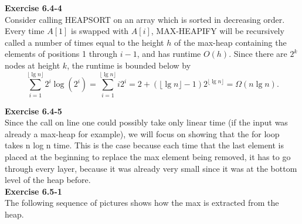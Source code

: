 \documentclass{article}
\begin{document}
\noindent\textbf{Exercise 6.4-4}\\

Consider calling HEAPSORT on an array which is sorted in decreasing order.  Every time $A[1]$ is swapped with $A[i]$, MAX-HEAPIFY will be recursively called a number of times equal to the height $h$ of the max-heap containing the elements of positions 1 through $i-1$, and has runtime $O(h)$.  Since there are $2^k$ nodes at height $k$, the runtime is bounded below by
\[ \sum_{i=1}^{\lfloor\lg n\rfloor} 2^i \log(2^i) =  \sum_{i=1}^{\lfloor\lg n\rfloor} i2^i = 2 + (\lfloor\lg n\rfloor - 1)2^{\lfloor\lg n\rfloor} = \Omega(n\lg n).\]



\noindent\textbf{Exercise 6.4-5}\\

Since the call on line one could possibly take only linear time (if the input was already a max-heap for example), we will focus on showing that the for loop takes n log n time. This is the case because each time that the last element is placed at the beginning to replace the max element being removed, it has to go through every layer, because it was already very small since it was at the bottom level of the heap before.\\

\noindent\textbf{Exercise 6.5-1}\\


The following sequence of pictures shows how the max is extracted from the heap.
\end{document}

